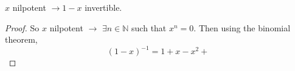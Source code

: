 \documentclass[]{article}
\begin{document}
    \begin{example}
        $x$ nilpotent $\rightarrow 1-x$ invertible.
    \end{example}
    \begin{proof}
        So $x$ nilpotent $\rightarrow$ $\exists n \in\mathbb{N}$ such that $x^n = 0$. 
        Then using the binomial theorem,
        $$(1-x)^{-1} = 1+x-x^2 + $$
    \end{proof}
\end{document}
